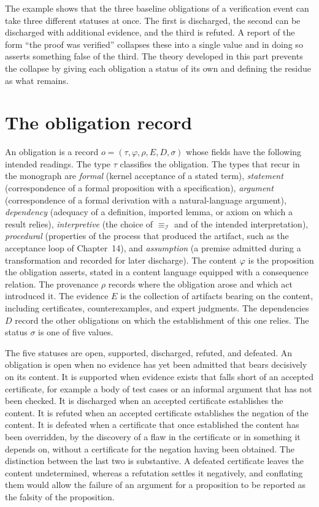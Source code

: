 The example shows that the three baseline obligations of a verification event can take three different statuses at once. The first is discharged, the second can be discharged with additional evidence, and the third is refuted. A report of the form ``the proof was verified'' collapses these into a single value and in doing so asserts something false of the third. The theory developed in this part prevents the collapse by giving each obligation a status of its own and defining the residue as what remains.

\section{The obligation record}

An obligation is a record $o = (\tau, \varphi, \rho, E, D, \sigma)$ whose fields have the following intended readings. The type $\tau$ classifies the obligation. The types that recur in the monograph are \emph{formal} (kernel acceptance of a stated term), \emph{statement} (correspondence of a formal proposition with a specification), \emph{argument} (correspondence of a formal derivation with a natural-language argument), \emph{dependency} (adequacy of a definition, imported lemma, or axiom on which a result relies), \emph{interpretive} (the choice of $\equiv_{\mathcal{I}}$ and of the intended interpretation), \emph{procedural} (properties of the process that produced the artifact, such as the acceptance loop of Chapter~14), and \emph{assumption} (a premise admitted during a transformation and recorded for later discharge). The content $\varphi$ is the proposition the obligation asserts, stated in a content language equipped with a consequence relation. The provenance $\rho$ records where the obligation arose and which act introduced it. The evidence $E$ is the collection of artifacts bearing on the content, including certificates, counterexamples, and expert judgments. The dependencies $D$ record the other obligations on which the establishment of this one relies. The status $\sigma$ is one of five values.

The five statuses are \textsf{open}, \textsf{supported}, \textsf{discharged}, \textsf{refuted}, and \textsf{defeated}. An obligation is \textsf{open} when no evidence has yet been admitted that bears decisively on its content. It is \textsf{supported} when evidence exists that falls short of an accepted certificate, for example a body of test cases or an informal argument that has not been checked. It is \textsf{discharged} when an accepted certificate establishes the content. It is \textsf{refuted} when an accepted certificate establishes the negation of the content. It is \textsf{defeated} when a certificate that once established the content has been overridden, by the discovery of a flaw in the certificate or in something it depends on, without a certificate for the negation having been obtained. The distinction between the last two is substantive. A defeated certificate leaves the content undetermined, whereas a refutation settles it negatively, and conflating them would allow the failure of an argument for a proposition to be reported as the falsity of the proposition.


